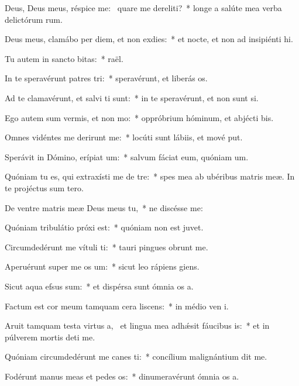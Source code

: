 \item Deus, Deus meus, réspice  me:~\pscross{} quare me dereliti?~* longe a salúte mea verba delictórum rum.
\item Deus meus, clamábo per diem, et non exdies:~* et nocte, et non ad insipiénti hi.
\item Tu autem in sancto bitas:~*  raël.
\item In te speravérunt patres tri:~* speravérunt, et liberás os.
\item Ad te clamavérunt, et salvi ti sunt:~* in te speravérunt, et non sunt si.
\item Ego autem sum vermis, et non mo:~* oppróbrium hóminum, et abjécti bis.
\item Omnes vidéntes me derirunt me:~* locúti sunt lábiis, et mové put.
\item Sperávit in Dómino, erípiat um:~* salvum fáciat eum, quóniam  um.
\item Quóniam tu es, qui extraxísti me de tre:~* spes mea ab ubéribus matris meæ. In te projéctus sum  tero.
\item De ventre matris meæ Deus meus  tu,~* ne discésse  me:
\item Quóniam tribulátio próxi est:~* quóniam non est  juvet.
\item Circumdedérunt me vítuli ti:~* tauri pingues obrunt me.
\item Aperuérunt super me os um:~* sicut leo rápiens  giens.
\item Sicut aqua efsus sum:~* et dispérsa sunt ómnia os a.
\item Factum est cor meum tamquam cera liscens:~* in médio ven i.
\item Aruit tamquam testa virtus a,~\pscross{} et lingua mea adhǽsit fáucibus is:~* et in púlverem mortis deti me.
\item Quóniam circumdedérunt me canes ti:~* concílium malignántium dit me.
\item Fodérunt manus meas et pedes os:~* dinumeravérunt ómnia os a.
